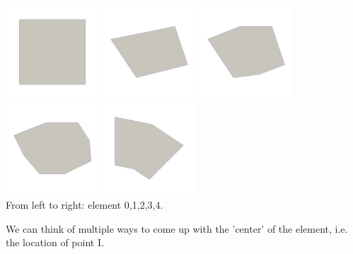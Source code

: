 \begin{center}
\includegraphics[width=3.5cm]{images/mappings/biquadratic3/elt0/element0}
\includegraphics[width=3.5cm]{images/mappings/biquadratic3/elt1/element1}
\includegraphics[width=3.5cm]{images/mappings/biquadratic3/elt2/element2}
\includegraphics[width=3.5cm]{images/mappings/biquadratic3/elt3/element3}
\includegraphics[width=3.5cm]{images/mappings/biquadratic3/elt4/element4}\\
{\captionfont From left to right: element 0,1,2,3,4.}
\end{center}

We can think of multiple ways to come up with the 'center' of the element, 
i.e. the location of point I.

